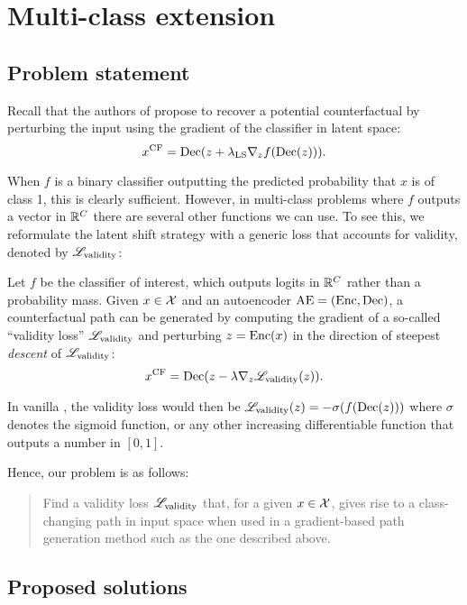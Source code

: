 \documentclass[../main.tex]{subfiles}
\begin{document}
\section{Multi-class extension}

\subsection{Problem statement}

Recall that the authors of \ls{} propose to recover a potential counterfactual by perturbing the input using the gradient of the classifier in latent space:
\begin{equation*}
    x^\mathrm{CF} = \operatorname{Dec}(z + \lambda_\text{LS} \nabla_z f(\operatorname{Dec}(z))).
\end{equation*}

When $f$ is a binary classifier outputting the predicted probability that $x$ is of class 1, this is clearly sufficient.
However, in multi-class problems where $f$ outputs a vector in $\mathbb{R}^C$ there are several other functions we can use.
To see this, we reformulate the latent shift strategy with a generic loss that accounts for validity, denoted by $\mathscr{L}_\text{validity}$:

Let $f$ be the classifier of interest, which outputs logits in $\mathbb{R}^C$ rather than a probability mass.
Given $x \in \mathcal{X}$ and an autoencoder $\mathrm{AE} = (\operatorname{Enc}, \operatorname{Dec})$, a counterfactual path can be generated by computing the gradient of a so-called ``validity loss'' $\mathscr{L}_\text{validity}$ and perturbing $z = \operatorname{Enc}(x)$ in the direction of steepest \emph{descent} of $\mathscr{L}_\text{validity}$:
\begin{equation*}
x^\mathrm{CF} = \operatorname{Dec}(z - \lambda \nabla_z \mathscr{L}_\text{validity}(z)).
\end{equation*}

In vanilla \ls{}, the validity loss would then be $\mathscr{L}_\text{validity}(z) = - \sigma(f(\operatorname{Dec}(z)))$ where $\sigma$ denotes the sigmoid function, or any other increasing differentiable function that outputs a number in $[0, 1]$.

Hence, our problem is as follows:
\begin{quote}
Find a validity loss $\mathscr{L}_\text{validity}$ that, for a given $x \in \mathcal{X}$, gives rise to a class-changing path in input space when used in a gradient-based path generation method such as the one described above.
\end{quote}

\subsection{Proposed solutions}
\label{sec:validity_losses}
\end{document}
